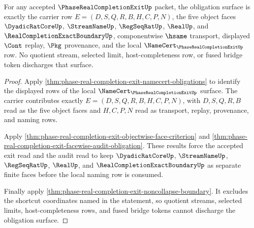 \begin{theorem}
\label{thm:phase-real-completion-exit-obligation-surface-package}
For any accepted $\PhaseRealCompletionExitUp$ packet, the obligation surface is exactly the carrier row $E=(D,S,Q,R,B,H,C,P,N)$, the five object faces $\DyadicRatCoreUp$, $\StreamNameUp$, $\RegSeqRatUp$, $\RealUp$, and $\RealCompletionExactBoundaryUp$, componentwise $\hsame$ transport, displayed $\Cont$ replay, $\Pkg$ provenance, and the local $\NameCert_{\PhaseRealCompletionExitUp}$ row. No quotient stream, selected limit, host-completeness row, or fused bridge token discharges that surface.
\end{theorem}
\begin{proof}
Apply \autoref{thm:phase-real-completion-exit-namecert-obligations} to identify the displayed rows of the local $\NameCert_{\PhaseRealCompletionExitUp}$ surface. The carrier contributes exactly $E=(D,S,Q,R,B,H,C,P,N)$, with $D,S,Q,R,B$ read as the five object faces and $H,C,P,N$ read as transport, replay, provenance, and naming rows.

Apply \autoref{thm:phase-real-completion-exit-objectwise-face-criterion} and \autoref{thm:phase-real-completion-exit-facewise-audit-obligation}. These results force the accepted exit read and the audit read to keep $\DyadicRatCoreUp$, $\StreamNameUp$, $\RegSeqRatUp$, $\RealUp$, and $\RealCompletionExactBoundaryUp$ as separate finite faces before the local naming row is consumed.

Finally apply \autoref{thm:phase-real-completion-exit-noncollapse-boundary}. It excludes the shortcut coordinates named in the statement, so quotient streams, selected limits, host-completeness rows, and fused bridge tokens cannot discharge the obligation surface.
\end{proof}

